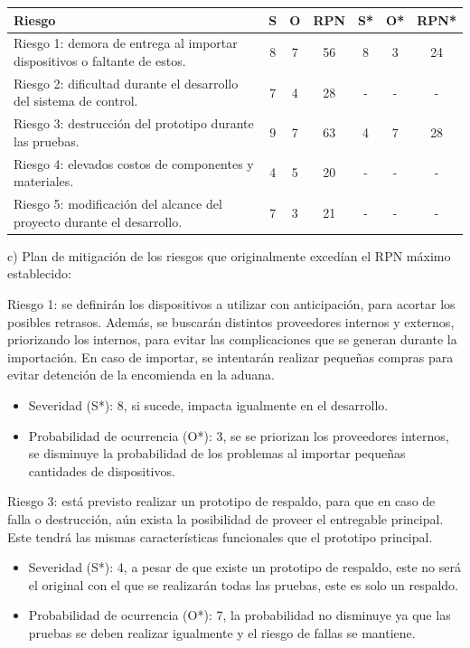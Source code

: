\documentclass[
11pt, %
]{charter}
\begin{document}
\begin{table}[htpb]
\centering
\begin{tabularx}{\linewidth}{@{}|X|c|c|c|c|c|c|@{}}
\hline
\rowcolor[HTML]{C0C0C0} 
Riesgo & S & O & RPN & S* & O* & RPN* \\ \hline
   Riesgo 1: demora de entrega al importar dispositivos o faltante de estos.    & 8  & 7  &  56   &  8  &  3  &  24    \\ \hline
   Riesgo 2: dificultad durante el desarrollo del sistema de control.    & 7  & 4  &  28   &  -  &  -  &   -   \\ \hline
   Riesgo 3: destrucción del prototipo durante las pruebas.    & 9  & 7  &  63   &  4  & 7   &  28    \\ \hline
   Riesgo 4: elevados costos de componentes y materiales.    &  4 & 5  &  20   &  -  &  -  &   -   \\ \hline
   Riesgo 5: modificación del alcance del proyecto durante el desarrollo.    & 7  & 3  &  21   &  -  &  -  &   -   \\ \hline
\end{tabularx}%
\end{table}

c) Plan de mitigación de los riesgos que originalmente excedían el RPN máximo establecido:

Riesgo 1: se definirán los dispositivos a utilizar con anticipación, para acortar los posibles retrasos. Además, se buscarán distintos proveedores internos y externos, priorizando los internos, para evitar las complicaciones que se generan durante la importación. En caso de importar, se intentarán realizar pequeñas compras para evitar detención de la encomienda en la aduana.

  \begin{itemize}
	\item Severidad (S*): 8, si sucede, impacta igualmente en el desarrollo.
	\item Probabilidad de ocurrencia (O*): 3, se se priorizan los proveedores internos, se disminuye la probabilidad de los problemas al importar pequeñas cantidades de dispositivos.
	\end{itemize}

Riesgo 3: está previsto realizar un prototipo de respaldo, para que en caso de falla o destrucción, aún exista la posibilidad de proveer el entregable principal. Este tendrá las mismas características funcionales que el prototipo principal.
  \begin{itemize}
	\item Severidad (S*): 4, a pesar de que existe un prototipo de respaldo, este no será el original con el que se realizarán todas las pruebas, este es solo un respaldo.
	\item Probabilidad de ocurrencia (O*): 7, la probabilidad no disminuye ya que las pruebas se deben realizar igualmente y el riesgo de fallas se mantiene.
	\end{itemize}
\end{document}
